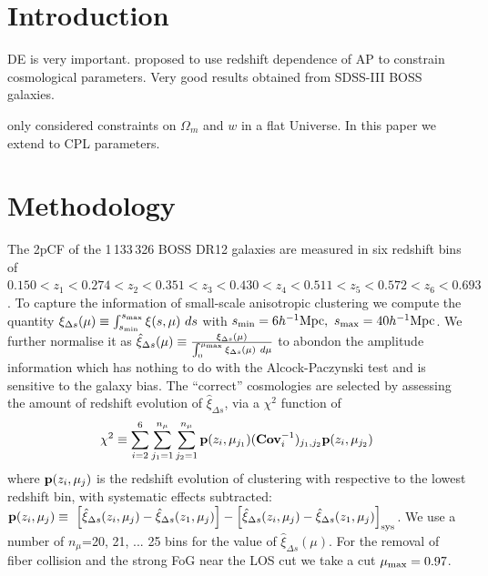 \documentclass[useAMS,usenatbib]{mnras}
\begin{document}

\section{Introduction}


DE is very important. 
\citep{Li2016} proposed to use redshift dependence of AP to constrain cosmological parameters.
Very good results obtained from SDSS-III BOSS galaxies.

\citep{Li2016} only considered constraints on $\Omega_m$ and $w$ in a flat Universe.
In this paper we extend to CPL parameters.




\section{Methodology}


The 2pCF of the 1\,133\,326 BOSS DR12 galaxies are measured in six redshift bins of
$0.150<z_1<0.274<z_2<0.351<z_3<0.430<z_4<0.511<z_5<0.572<z_6<0.693$.
To capture the information of small-scale anisotropic clustering we compute the quantity
$\xi_{\Delta s} (\mu) \equiv \int_{s_{\rm min}}^{s_{\rm max}} \xi (s,\mu)\ ds$
with $s_{\rm min}=6 h^{-1} {\rm Mpc},\ s_{\rm max}=40 h^{-1} {\rm Mpc}$.
We further normalise it as 
$\hat\xi_{\Delta s}(\mu) \equiv \frac{\xi_{\Delta s}(\mu)}{\int_{0}^{\mu_{\rm max}}\xi_{\Delta s}(\mu)\ d\mu}$
to abondon the amplitude information which has nothing to do with the Alcock-Paczynski test and is sensitive to the galaxy bias.
The ``correct'' cosmologies are selected by assessing the amount of redshift evolution of $\hat\xi_{\Delta s}$,
via a $\chi^2$ function of 
\begin{equation}
 \chi^2\equiv \sum_{i=2}^{6} \sum_{j_1=1}^{n_{\mu}} \sum_{j_2=1}^{n_{\mu}} {\bf p}(z_i,\mu_{j_1}) ({\bf Cov}_{i}^{-1})_{j_1,j_2}  {\bf p}(z_i,\mu_{j_2})
\end{equation}
where ${\bf p}(z_i,\mu_{j})$ is the redshift evolution of clustering with respective to the lowest redshift bin,
with systematic effects subtracted:
$ {\bf p}(z_i,\mu_{j}) \equiv\  \left[\hat\xi_{\Delta s}(z_i,\mu_j)-\hat\xi_{\Delta s}(z_1,\mu_j)\right] - \left[\hat\xi_{\Delta s}(z_i,\mu_j)-\hat\xi_{\Delta s}(z_1,\mu_j)\right]_{\rm sys}$.
We use a number of $n_{\mu}$=20, 21, ... 25 bins for the value of $\hat\xi_{\Delta s}(\mu)$.
For the removal of fiber collision and the strong FoG near the LOS cut we take a cut $\mu_{\rm max} = 0.97$.
\end{document}
